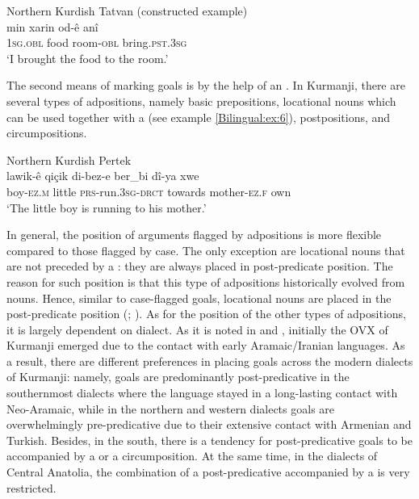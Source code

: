 \documentclass[output=paper,colorlinks,citecolor=brown]{langscibook}
\begin{document}
\ea\label{Bilingual:ex:5a}
Northern Kurdish Tatvan (constructed example) \\
\gll min xarin od-ê anî \\
\textsc{1sg.obl} food room\textsc{-obl} bring\textsc{.pst.3sg} \\
\glt `I brought the food to the room.'
\z

The second means of marking goals is by the help of an . In Kurmanji, there are several types of adpositions, namely basic prepositions, locational nouns which can be used together with a  (see example \ref{Bilingual:ex:6}), postpositions, and circumpositions. 

\ea\label{Bilingual:ex:6}
Northern Kurdish Pertek \citep[K028]{matras2016dialects} \\
\gll lawik-ê qiçik di-bez-e ber\_bi dî-ya xwe \\
boy\textsc{-ez.m} little \textsc{prs-}run\textsc{.3sg-drct} towards mother\textsc{-ez.f} own \\
\glt `The little boy is running to his mother.'
\z

In general, the position of  arguments flagged by adpositions is more flexible compared to those flagged by case. The only exception are locational nouns that are not preceded by a : they are always placed in post-predicate position. The reason for such position is that this type of adpositions historically evolved from nouns. Hence, similar to case-flagged goals, locational nouns are placed in the post-predicate position (\citealt{haig_verb-goal_2015}; \citealt{haig_post-predicate_2014}). As for the position of the other types of adpositions, it is largely dependent on dialect. As it is noted in \citet{haig_verb-goal_2015} and \citet{haig_post-predicate_2014}, initially the OVX  of Kurmanji emerged due to the contact with early Aramaic/Iranian languages. As a result, there are different preferences in placing goals across the modern dialects of Kurmanji: namely, goals are predominantly post-predicative in the southernmost dialects where the language stayed in a long-lasting contact with Neo-Aramaic, while in the northern and western dialects goals are overwhelmingly pre-predicative due to their extensive contact with Armenian and Turkish. Besides, in the south, there is a tendency for post-predicative goals to be accompanied by a  or a circumposition. At the same time, in the dialects of Central Anatolia, the combination of a post-predicative  accompanied by a  is very restricted. 
\end{document}
